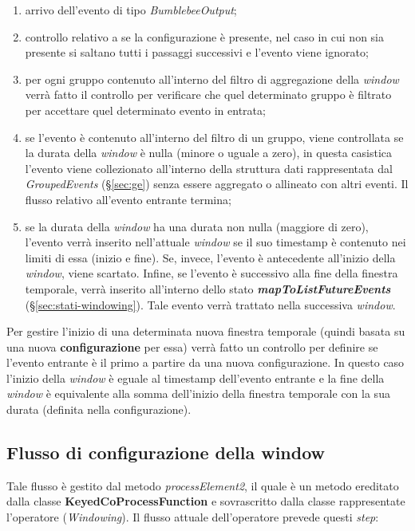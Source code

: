 \begin{enumerate}
	\item{arrivo dell'evento di tipo \textit{BumblebeeOutput};}
	\item{controllo relativo a se la configurazione è presente, nel caso in cui non sia presente si saltano tutti i passaggi successivi e l'evento viene ignorato;}
	\item{per ogni gruppo contenuto all'interno del filtro di aggregazione della \textit{window} verrà fatto il controllo per verificare che quel determinato gruppo è filtrato per accettare quel determinato evento in entrata;}
\item{se l'evento è contenuto all'interno del filtro di un gruppo, viene controllata se la durata della \textit{window} è nulla (minore o uguale a zero), in questa casistica l'evento viene collezionato all'interno della struttura dati rappresentata dal \textit{GroupedEvents} (\S\ref{sec:ge}) senza essere aggregato o allineato con altri eventi. Il flusso relativo all'evento entrante termina;}
\item{se la durata della \textit{window} ha una durata non nulla (maggiore di zero), l'evento verrà inserito nell'attuale \textit{window} se il suo \gls{timestamp} è contenuto nei limiti di essa (inizio e fine). Se, invece, l'evento è antecedente all'inizio della \textit{window}, viene scartato. Infine, se l'evento è successivo alla fine della finestra temporale, verrà inserito all'interno dello stato \textbf{\textit{mapToListFutureEvents}} (\S\ref{sec:stati-windowing}). Tale evento verrà trattato nella successiva \textit{window}.}
\end{enumerate}

Per gestire l'inizio di una determinata nuova finestra temporale (quindi basata su una nuova \textbf{configurazione} per essa) verrà fatto un controllo per definire se l'evento entrante è il primo a partire da una nuova configurazione. In questo caso l'inizio della \textit{window} è eguale al \gls{timestamp} dell'evento entrante e la fine della \textit{window} è equivalente alla somma dell'inizio della finestra temporale con la sua durata (definita nella configurazione).
\subsection{Flusso di configurazione della window}\label{sec:pr2-windowing}
Tale flusso è gestito dal metodo \textit{processElement2}, il quale è un metodo ereditato dalla classe \textbf{KeyedCoProcessFunction} e sovrascritto dalla classe rappresentate l'operatore (\textit{Windowing}). Il flusso attuale dell'operatore prevede questi \textit{step}:

